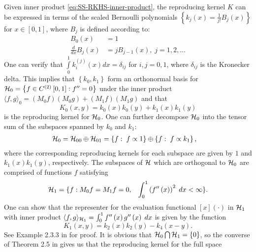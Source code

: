 Given inner product \eqref{eq:SS-RKHS-inner-product}, the reproducing kernel $K$ can be expressed in terms of the scaled Bernoulli polynomials $\left\{ k_j\left(x\right) = \frac{1}{j!}B_j\left(x\right) \right\}$ for $x \in \left[0,1\right]$, where $B_j$ is defined according to:
\begin{align*}
B_0\left(x\right) &= 1\\
\frac{d}{dx} B_j\left(x\right) &= jB_{j-1}\left(x\right), \;j = 1, 2, \dots
\end{align*}
\noindent
One can verify that $\int \limits_0^1 k_i^{\left(j\right)}\left(x \right)dx = \delta_{ij}$ for $i,j= 0,1$, where $\delta_{ij}$ is the Kronecker delta. This implies that  $\left\{k_0, k_1\right\}$ form an orthonormal basis for $\mathcal{H}_{0} = \left\{ f \in C^{\left(2\right)}\left[0,1\right]: f'' = 0 \right\}$ under the inner product $\langle f,g\rangle_0 =  \left(M_0 f \right)\left(M_0 g\right) + \left(M_1 f\right) \left(M_1 g\right)$ and that 
\[
K_{0}\left(x,y\right) =  k_0\left(x\right)  k_0\left(y\right) +  k_1\left(x\right)  k_1\left(y\right) 
\]
\noindent
is the reproducing kernel for $\mathcal{H}_{0}$. One can further decompose $\mathcal{H}_0$ into the tensor sum of the subspaces spanned by $k_0$ and $k_1$:
\begin{align}\label{eq:SS-RKHS-null-space-tensor-sum}
\mathcal{H}_0 &=  \mathcal{H}_{00} \oplus \mathcal{H}_{01}= \left\{f: \;f \propto 1 \right\} \oplus \left\{f: \;f \propto k_1\right\},
\end{align}
\noindent
where the corresponding reproducing kernels for each subspace are given by $1$ and $k_1\left(x\right)k_1\left(y\right)$, respectively. The subspaces of $\mathcal{H}$ which are orthogonal to $\mathcal{H}_0$ are comprised of functions $f$ satisfying 
\[
\hilbert_{1} = \lbrace f: M_0 f = M_1 f =  0,\;\;\;\int_{0}^1 \left(f''\left(x\right)\right)^2\;dx < \infty \rbrace. %
\]
One can show that the representer for the evaluation functional $\left[x\right] \left(\cdot\right)$ in $\mathcal{H}_{1}$ with inner product $\langle f,g\rangle_{\mathcal{H}_1}= \int_0^1 f''\left(x\right)g''\left(x\right)\;dx$ is given by the function
\begin{equation}
{{K }_{1}}\left(x,y\right) = k_{2}\left(x\right)k_{2}\left(y\right) - k_{4}\left(x-y \right).
\end{equation}
\noindent
See Example 2.3.3 in \cite{gu2002smoothing} for proof. It is obvious that $\mathcal{H}_0 \bigcap \mathcal{H}_1 = \left\{0\right\}$, so the converse of Theorem 2.5 in \cite{gu2013smoothing} gives us that the reproducing kernel for the full space
